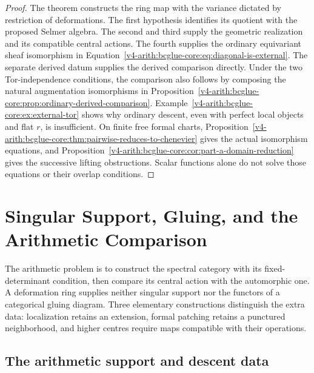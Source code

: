 \begin{proof}
The theorem constructs the ring map with the variance dictated by
restriction of deformations. The first hypothesis identifies its
quotient with the proposed Selmer algebra. The second and third
supply the geometric realization and its compatible central actions.
The fourth supplies the ordinary equivariant sheaf isomorphism
in Equation~\eqref{v4-arith:bcglue-core:eq:diagonal-is-external}.
The separate derived datum supplies the derived comparison directly.
Under the two Tor-independence conditions, the comparison also follows
by composing the natural augmentation isomorphisms in
Proposition~\ref{v4-arith:bcglue-core:prop:ordinary-derived-comparison}.
Example~\ref{v4-arith:bcglue-core:ex:external-tor} shows why ordinary
descent, even with perfect local objects and flat $r$, is insufficient.
On finite free formal charts,
Proposition~\ref{v4-arith:bcglue-core:thm:pairwise-reduces-to-chenevier}
gives the actual isomorphism equations, and
Proposition~\ref{v4-arith:bcglue-core:cor:part-a-domain-reduction}
gives the successive lifting obstructions. Scalar functions alone
do not solve those equations or their overlap conditions.
\end{proof}

\section{Singular Support, Gluing, and the Arithmetic Comparison}
\label{v4-arith:w5-h:agdet}

The arithmetic problem is to construct the spectral category with its
fixed-determinant condition, then compare its central action with the
automorphic one. A deformation ring supplies neither singular support
nor the functors of a categorical gluing diagram. Three elementary
constructions distinguish the extra data: localization retains an
extension, formal patching retains a punctured neighborhood, and higher
centres require maps compatible with their operations.

\subsection{The arithmetic support and descent data}

